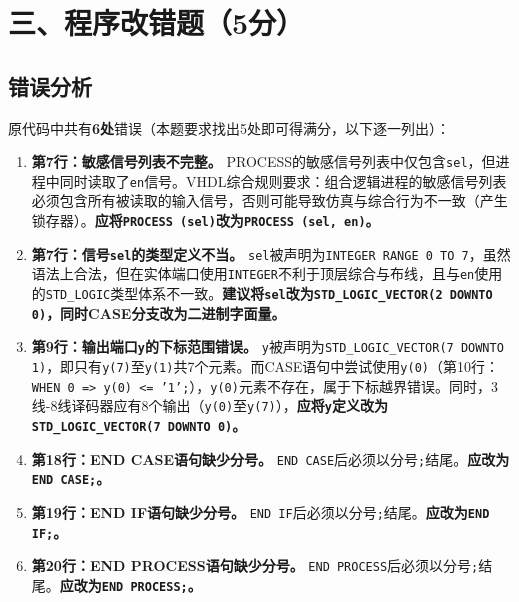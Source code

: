 \newpage

\section{三、程序改错题（5分）}

\subsection*{错误分析}

原代码中共有\textbf{6处}错误（本题要求找出5处即可得满分，以下逐一列出）：

\begin{enumerate}[label=\textbf{错误\arabic*：}]

\item \textbf{第7行：敏感信号列表不完整。}
PROCESS的敏感信号列表中仅包含\texttt{sel}，但进程中同时读取了\texttt{en}信号。VHDL综合规则要求：组合逻辑进程的敏感信号列表必须包含所有被读取的输入信号，否则可能导致仿真与综合行为不一致（产生锁存器）。\textbf{应将\texttt{PROCESS (sel)}改为\texttt{PROCESS (sel, en)}。}

\item \textbf{第7行：信号\texttt{sel}的类型定义不当。}
\texttt{sel}被声明为\texttt{INTEGER RANGE 0 TO 7}，虽然语法上合法，但在实体端口使用\texttt{INTEGER}不利于顶层综合与布线，且与\texttt{en}使用的\texttt{STD\_LOGIC}类型体系不一致。\textbf{建议将\texttt{sel}改为\texttt{STD\_LOGIC\_VECTOR(2 DOWNTO 0)}，同时CASE分支改为二进制字面量。}

\item \textbf{第9行：输出端口\texttt{y}的下标范围错误。}
\texttt{y}被声明为\texttt{STD\_LOGIC\_VECTOR(7 DOWNTO 1)}，即只有\texttt{y(7)}至\texttt{y(1)}共7个元素。而CASE语句中尝试使用\texttt{y(0)}（第10行：\texttt{WHEN 0 => y(0) <= '1';}），\texttt{y(0)}元素不存在，属于下标越界错误。同时，3线-8线译码器应有8个输出（\texttt{y(0)}至\texttt{y(7)}），\textbf{应将\texttt{y}定义改为\texttt{STD\_LOGIC\_VECTOR(7 DOWNTO 0)}。}

\item \textbf{第18行：END CASE语句缺少分号。}
\texttt{END CASE}后必须以分号\texttt{;}结尾。\textbf{应改为\texttt{END CASE;}。}

\item \textbf{第19行：END IF语句缺少分号。}
\texttt{END IF}后必须以分号\texttt{;}结尾。\textbf{应改为\texttt{END IF;}。}

\item \textbf{第20行：END PROCESS语句缺少分号。}
\texttt{END PROCESS}后必须以分号\texttt{;}结尾。\textbf{应改为\texttt{END PROCESS;}。}

\end{enumerate}

